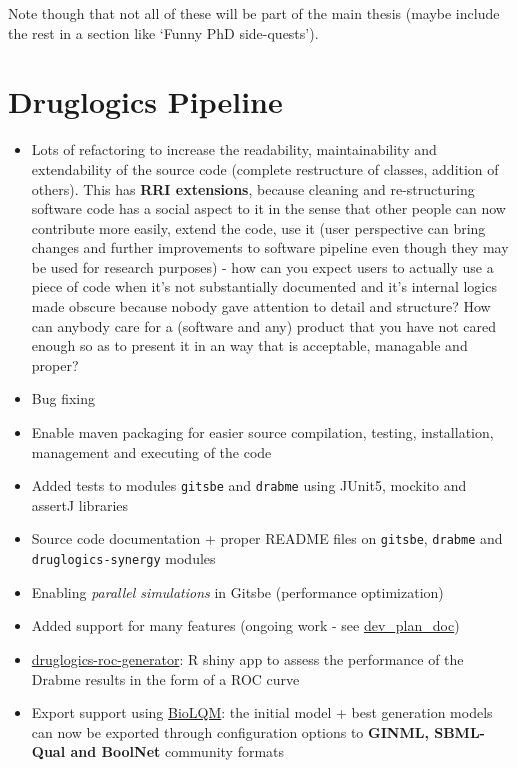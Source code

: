 \documentclass[
  12pt,
]{book}
\providecommand{\tightlist}{%
  \setlength{\itemsep}{0pt}\setlength{\parskip}{0pt}}
\begin{document}
Note though that not all of these will be part of the main thesis (maybe include the
rest in a section like `Funny PhD side-quests').

\hypertarget{dlpipe}{%
\section{Druglogics Pipeline}\label{dlpipe}}

\begin{itemize}
\tightlist
\item
  Lots of refactoring to increase the readability, maintainability and
  extendability of the source code (complete restructure of classes, addition of
  others).
  This has \textbf{RRI extensions}, because cleaning and re-structuring software code has a social aspect to it in the sense that other people can now contribute more easily, extend the code, use it (user perspective can bring changes and further improvements to software pipeline even though they may be used for research purposes) - how can you expect users to actually use a piece of code when it's not substantially documented and it's internal logics made obscure because nobody gave attention to detail and structure? How can anybody care for a (software and any) product that you have not cared enough so as to present it in an way that is acceptable, managable and proper?
\item
  Bug fixing
\item
  Enable maven packaging for easier source compilation, testing,
  installation, management and executing of the code
\item
  Added tests to modules \texttt{gitsbe} and \texttt{drabme} using JUnit5, mockito and assertJ libraries
\item
  Source code documentation + proper README files on \texttt{gitsbe}, \texttt{drabme} and \texttt{druglogics-synergy} modules
\item
  Enabling \emph{parallel simulations} in Gitsbe (performance optimization)
\item
  Added support for many features (ongoing work - see \href{https://docs.google.com/document/d/1OUupR0b-28YB9pVAww77RMecnFN6A39MYjXMjljmvG4/edit?usp=sharing}{dev\_plan\_doc})
\item
  \href{https://github.com/bblodfon/druglogics-roc-generator}{druglogics-roc-generator}:
  R shiny app to assess the performance of the Drabme results in the form of a
  ROC curve
\item
  Export support using \href{https://github.com/colomoto/bioLQM}{BioLQM}: the
  initial model + best generation models can now be exported through configuration
  options to \textbf{GINML, SBML-Qual and BoolNet} community formats
\end{itemize}
\end{document}
